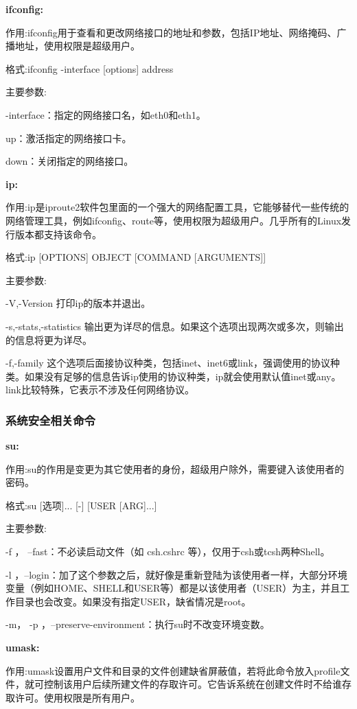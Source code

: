 \textbf{ifconfig:}

作用:ifconfig用于查看和更改网络接口的地址和参数，包括IP地址、网络掩码、广播地址，使用权限是超级用户。

格式:ifconfig -interface [options] address

主要参数:

-interface：指定的网络接口名，如eth0和eth1。

up：激活指定的网络接口卡。

down：关闭指定的网络接口。

\textbf{ip:}

作用:ip是iproute2软件包里面的一个强大的网络配置工具，它能够替代一些传统的网络管理工具，例如ifconfig、route等，使用权限为超级用户。几乎所有的Linux发行版本都支持该命令。

格式:ip [OPTIONS] OBJECT [COMMAND [ARGUMENTS]]

主要参数:

-V,-Version 打印ip的版本并退出。

-s,-stats,-statistics 输出更为详尽的信息。如果这个选项出现两次或多次，则输出的信息将更为详尽。

-f,-family 这个选项后面接协议种类，包括inet、inet6或link，强调使用的协议种类。如果没有足够的信息告诉ip使用的协议种类，ip就会使用默认值inet或any。link比较特殊，它表示不涉及任何网络协议。

\subsubsection{系统安全相关命令}

\textbf{su:}

作用:su的作用是变更为其它使用者的身份，超级用户除外，需要键入该使用者的密码。

格式:su [选项]... [-] [USER [ARG]...]

主要参数:

-f ， --fast：不必读启动文件（如 csh.cshrc 等），仅用于csh或tcsh两种Shell。

-l ，--login：加了这个参数之后，就好像是重新登陆为该使用者一样，大部分环境变量（例如HOME、SHELL和USER等）都是以该使用者（USER）为主，并且工作目录也会改变。如果没有指定USER，缺省情况是root。

-m， -p ，--preserve-environment：执行su时不改变环境变数。


\textbf{umask:}

作用:umask设置用户文件和目录的文件创建缺省屏蔽值，若将此命令放入profile文件，就可控制该用户后续所建文件的存取许可。它告诉系统在创建文件时不给谁存取许可。使用权限是所有用户。

